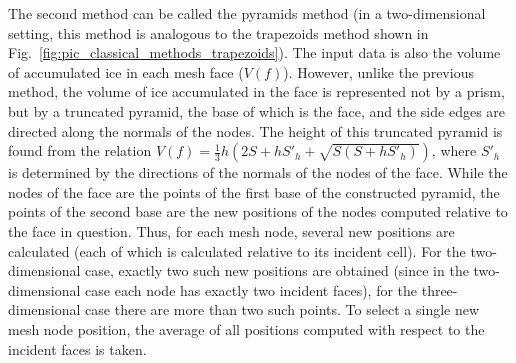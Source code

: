 \documentclass[
11pt,%
tightenlines,%
twoside,%
onecolumn,%
nofloats,%
nobibnotes,%
nofootinbib,%
superscriptaddress,%
noshowpacs,%
centertags]%
{revtex4}
\begin{document}
The second method can be called the pyramids method (in a two-dimensional setting, this method is analogous to the trapezoids method shown in Fig.~\ref{fig:pic_classical_methods_trapezoids}).
The input data is also the volume of accumulated ice in each mesh face ($V(f)$).
However, unlike the previous method, the volume of ice accumulated in the face is represented not by a prism, but by a truncated pyramid, the base of which is the face, and the side edges are directed along the normals of the nodes.
The height of this truncated pyramid is found from the relation $V(f) = \frac{1}{3} h (2S + hS'_h + \sqrt{S(S + hS'_h)})$, where $S'_h$ is determined by the directions of the normals of the nodes of the face.
While the nodes of the face are the points of the first base of the constructed pyramid, the points of the second base are the new positions of the nodes computed relative to the face in question.
Thus, for each mesh node, several new positions are calculated (each of which is calculated relative to its incident cell).
For the two-dimensional case, exactly two such new positions are obtained (since in the two-dimensional case each node has exactly two incident faces), for the three-dimensional case there are more than two such points.
To select a single new mesh node position, the average of all positions computed with respect to the incident faces is taken.
\end{document}
